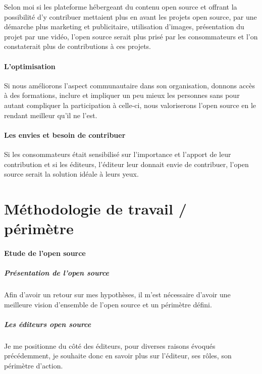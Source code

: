 			Selon moi si les plateforme hébergeant du contenu open source et offrant la possibilité d'y contribuer mettaient plus en avant les projets open source, par une démarche plus marketing et publicitaire, utilisation d'images, présentation du projet par une vidéo, l'open source serait plus prisé par les consommateurs et l'on constaterait plus de contributions à ces projets.

		\paragraph{L'optimisation\\}

			Si nous améliorons l'aspect communautaire dans son organisation, donnons accès à des formations, inclure et impliquer un peu mieux les personnes sans pour autant compliquer la participation à celle-ci, nous valoriserons l'open source en le rendant meilleur qu'il ne l'est.

		\paragraph{Les envies et besoin de contribuer\\}

			Si les consommateurs était sensibilisé sur l'importance et l'apport de leur contribution et si les éditeurs, l'éditeur leur donnait envie de contribuer, l'open source serait la solution idéale à leurs yeux.

	\section{Méthodologie de travail / périmètre}
		\paragraph{Etude de l'open source}

			\subparagraph{Présentation de l'open source\\}

				Afin d'avoir un retour sur mes hypothèses, il m'est nécessaire d'avoir une meilleure vision d'ensemble de l'open source et un périmètre défini.

			\subparagraph{Les éditeurs open source\\}

				Je me positionne du côté des éditeurs, pour diverses raisons évoqués précédemment, je souhaite donc en savoir plus sur l'éditeur, ses rôles, son périmètre d'action.

